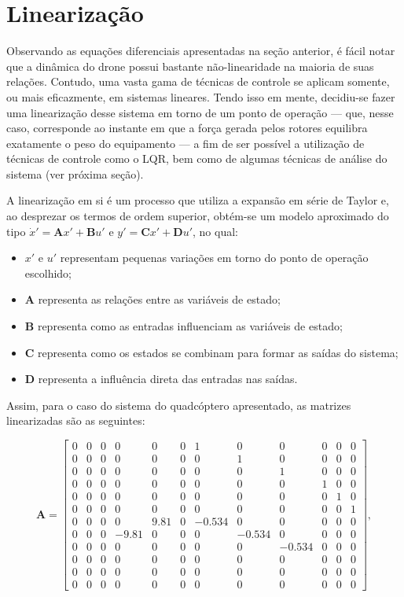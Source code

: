 \section{Linearização}
Observando as equações diferenciais apresentadas na seção anterior, é fácil notar que a dinâmica do drone possui 
bastante não-linearidade na maioria de suas relações. Contudo, uma vasta gama de técnicas de controle se aplicam 
somente, ou mais eficazmente, em sistemas lineares. Tendo isso em mente, decidiu-se fazer uma linearização desse 
sistema em torno de um ponto de operação — que, nesse caso, corresponde ao instante em que a força gerada pelos 
rotores equilibra exatamente o peso do equipamento — a fim de ser possível a utilização de técnicas de controle 
como o LQR, bem como de algumas técnicas de análise do sistema (ver próxima seção).

A linearização em si é um processo que utiliza a expansão em série de Taylor e, ao desprezar os termos de ordem 
superior, obtém-se um modelo aproximado do tipo $\dot{x}' = \mathbf{A} x' + \mathbf{B} u'$ e $y' = \mathbf{C} x' 
+ \mathbf{D} u'$, no qual:

\begin{itemize}
    \item $x'$ e $u'$ representam pequenas variações em torno do ponto de operação escolhido;
    \item $\mathbf{A}$ representa as relações entre as variáveis de estado;
    \item $\mathbf{B}$ representa como as entradas influenciam as variáveis de estado;
    \item $\mathbf{C}$ representa como os estados se combinam para formar as saídas do sistema;
    \item $\mathbf{D}$ representa a influência direta das entradas nas saídas.
\end{itemize}

Assim, para o caso do sistema do quadcóptero apresentado, 
as matrizes linearizadas são as seguintes:

\[
\mathbf{A} =
\left[\begin{array}{cccccccccccc}
0 & 0 & 0 & 0 & 0 & 0 & 1 & 0 & 0 & 0 & 0 & 0 \\
0 & 0 & 0 & 0 & 0 & 0 & 0 & 1 & 0 & 0 & 0 & 0 \\
0 & 0 & 0 & 0 & 0 & 0 & 0 & 0 & 1 & 0 & 0 & 0 \\
0 & 0 & 0 & 0 & 0 & 0 & 0 & 0 & 0 & 1 & 0 & 0 \\
0 & 0 & 0 & 0 & 0 & 0 & 0 & 0 & 0 & 0 & 1 & 0 \\
0 & 0 & 0 & 0 & 0 & 0 & 0 & 0 & 0 & 0 & 0 & 1 \\
0 & 0 & 0 & 0 & 9.81 & 0 & -0.534 & 0 & 0 & 0 & 0 & 0 \\
0 & 0 & 0 & -9.81 & 0 & 0 & 0 & -0.534 & 0 & 0 & 0 & 0 \\
0 & 0 & 0 & 0 & 0 & 0 & 0 & 0 & -0.534 & 0 & 0 & 0 \\
0 & 0 & 0 & 0 & 0 & 0 & 0 & 0 & 0 & 0 & 0 & 0 \\
0 & 0 & 0 & 0 & 0 & 0 & 0 & 0 & 0 & 0 & 0 & 0 \\
0 & 0 & 0 & 0 & 0 & 0 & 0 & 0 & 0 & 0 & 0 & 0
\end{array}\right],
\label{mat:A_lin}
\]

